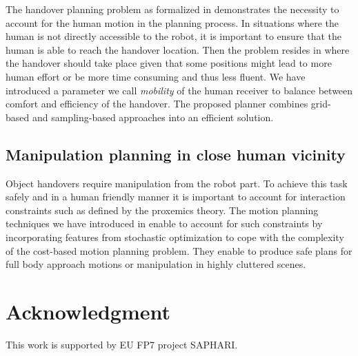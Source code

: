 \documentclass[conference]{IEEEtran}
\begin{document}
The handover planning problem as formalized in \cite{Mainprice:12} demonstrates
the necessity to account for the human motion in the planning process. In
situations where the human is not directly accessible to the robot, it is
important to ensure that the human is able to reach the handover location. Then
the problem resides in where the handover should take place given that some
positions might lead to more human effort or be more time consuming and thus
less fluent. We have introduced a parameter we call \textit{mobility} of the
human receiver to balance between comfort and efficiency of the handover. The
proposed planner combines grid-based and sampling-based approaches into an
efficient solution.

\subsection{Manipulation planning in close human vicinity}

Object handovers require manipulation from the robot part. To achieve this task
safely and in a human friendly manner it is important to account for
interaction constraints such as defined by the proxemics theory. The motion
planning techniques we have introduced in \cite{Mainprice:11}  enable to
account for such constraints by incorporating features from stochastic
optimization to cope with the complexity of the cost-based motion planning
problem. They enable to produce safe plans for full body approach motions or
manipulation in highly cluttered scenes.

\section*{Acknowledgment}

This work is supported by EU FP7 project SAPHARI.




\end{document}
